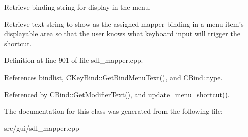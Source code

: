 Retrieve binding string for display in the menu. 

Retrieve text string to show as the assigned mapper binding in a menu item's displayable area so that the user knows what keyboard input will trigger the shortcut. 

Definition at line 901 of file sdl\-\_\-mapper.\-cpp.



References bindlist, C\-Key\-Bind\-::\-Get\-Bind\-Menu\-Text(), and C\-Bind\-::type.



Referenced by C\-Bind\-::\-Get\-Modifier\-Text(), and update\-\_\-menu\-\_\-shortcut().



The documentation for this class was generated from the following file\-:\begin{DoxyCompactItemize}
\item 
src/gui/sdl\-\_\-mapper.\-cpp\end{DoxyCompactItemize}
